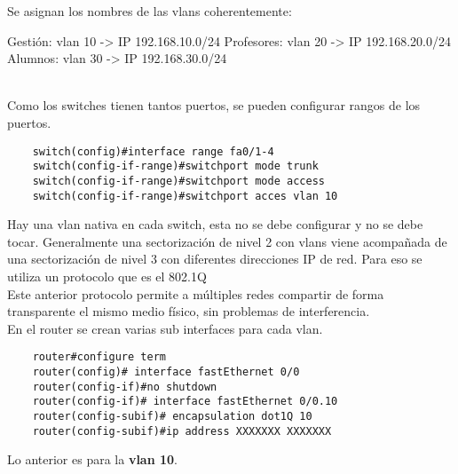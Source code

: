 Se asignan los nombres de las vlans coherentemente:

Gestión: vlan 10 -> IP 192.168.10.0/24
Profesores: vlan 20 -> IP 192.168.20.0/24
Alumnos: vlan 30 -> IP 192.168.30.0/24 \\\


Como los switches tienen tantos puertos, se pueden configurar rangos de los puertos. \\

\begin{verbatim}
    switch(config)#interface range fa0/1-4
    switch(config-if-range)#switchport mode trunk
    switch(config-if-range)#switchport mode access
    switch(config-if-range)#switchport acces vlan 10
\end{verbatim}

Hay una vlan nativa en cada switch, esta no se debe configurar y no se debe tocar. Generalmente una sectorización de nivel 2 con vlans viene acompañada de una sectorización de nivel 3 con diferentes direcciones IP de red. Para eso se utiliza un protocolo que es el 802.1Q\\

Este anterior protocolo permite a múltiples redes compartir de forma transparente el mismo medio físico, sin problemas de interferencia.\\

En el router se crean varias sub interfaces para cada vlan.

\begin{verbatim}
    router#configure term
    router(config)# interface fastEthernet 0/0
    router(config-if)#no shutdown
    router(config-if)# interface fastEthernet 0/0.10
    router(config-subif)# encapsulation dot1Q 10
    router(config-subif)#ip address XXXXXXX XXXXXXX
\end{verbatim}


Lo anterior es para la \textbf{vlan 10}.